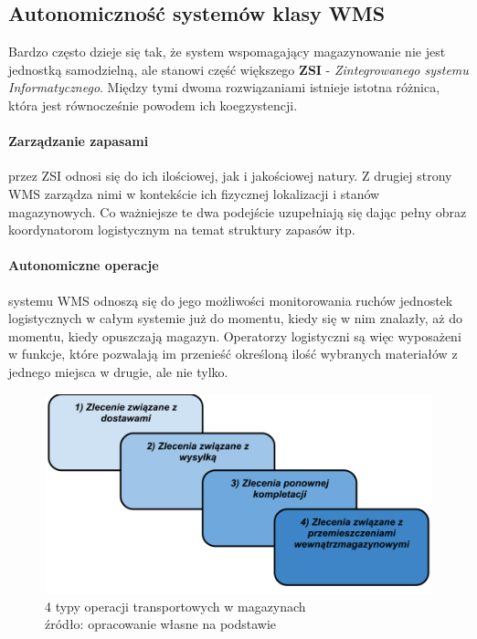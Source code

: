 	\subsection{Autonomiczność systemów klasy WMS}
		Bardzo często dzieje się tak, że system wspomagający magazynowanie nie jest jednostką samodzielną, ale 
		stanowi część większego \textbf{ZSI} - \textit{Zintegrowanego systemu Informatycznego}. Między tymi
		dwoma rozwiązaniami istnieje istotna różnica, która jest równocześnie powodem ich koegzystencji.
			\paragraph{Zarządzanie zapasami} przez ZSI odnosi się do ich ilościowej, jak i jakościowej natury. Z
			drugiej strony WMS zarządza nimi w kontekście ich fizycznej lokalizacji i stanów magazynowych. Co
			ważniejsze te dwa podejście uzupełniają się dając pełny obraz koordynatorom logistycznym na temat
			struktury zapasów itp. 
			\paragraph{Autonomiczne operacje} systemu WMS odnoszą się do jego możliwości monitorowania ruchów
			jednostek logistycznych w całym systemie już do momentu, kiedy się w nim znalazły, aż do momentu,
			kiedy opuszczają magazyn. Operatorzy logistyczni są więc wyposażeni w funkcje, które pozwalają
			im przenieść określoną ilość wybranych materiałów z jednego miejsca w drugie, ale nie tylko.
			\begin{figure}[H]
				\centering
				\includegraphics[width=\textwidth]{images/transport_ops}
				\caption[Operacja transportowe w magazynach]{
					4 typy operacji transportowych w magazynach\\
					źródło: opracowanie własne na podstawie \cite{IDL}
				}
			\end{figure}